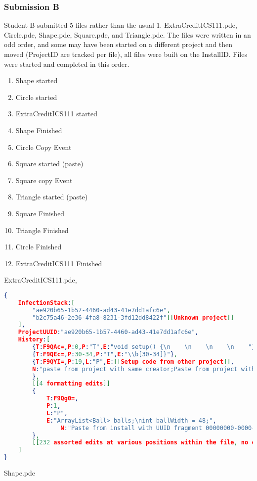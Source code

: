 \documentclass[conference]{IEEEtran}
\newcommand{\n}{\hfill\break}
\newcommand{\installID}{InstallID\xspace}
\newcommand{\projectID}{ProjectID\xspace}
\begin{document}
\subsubsection*{Submission B}
Student B submitted 5 files rather than the usual 1. ExtraCreditICS111.pde, Circle.pde, Shape.pde, Square.pde, and Triangle.pde.   The files were written in an odd order, and some may have been started on a different project and then moved (\projectID are tracked per file), all files were built on the \installID.  Files were started and completed in this order.
\begin{enumerate}
\item Shape started
\item Circle started 
\item ExtraCreditICS111 started
\item Shape Finished
\item Circle Copy Event
\item Square started (paste)
\item Square copy Event
\item Triangle started (paste)
\item Square Finished
\item Triangle Finished
\item Circle Finished
\item ExtraCreditICS111 Finished

\end{enumerate}\n

ExtraCreditICS111.pde,
\begin{lstlisting}[language=json]
{
	InfectionStack:[
		"ae920b65-1b57-4460-ad43-41e7dd1afc6e",
		"b2c75a46-2e36-4fa8-8231-3fd12dd8422f"[[Unknown project]]
	],
	ProjectUUID:"ae920b65-1b57-4460-ad43-41e7dd1afc6e",
	History:[
		{T:F9QAc=,P:0,P:"T",E:"void setup() {\n    \n    \n    \n    "},
		{T:F9QEc=,P:30-34,P:"T",E:"\\b[30-34]}"},
		{T:F9QYI=,P:19,L:"P",E:[[Setup code from other project]],
		N:"paste from project with same creator;Paste from project with UUID b2c75a46-2e36-4fa8-8231-3fd12dd8422f;"
		},
		[[4 formatting edits]]
		{
			T:F9Qg0=,
			P:1,
			L:"P",
			E:"ArrayList<Ball> balls;\nint ballWidth = 48;",
				N:"Paste from install with UUID fragment 00000000-0000-0000-0000-000000000000 -1 bytes long;"[[not enough room to encode UUID]]
		},
		[[232 assorted edits at various positions within the file, no copies or pastes]]
	]
}

\end{lstlisting}
Shape.pde
\end{document}
